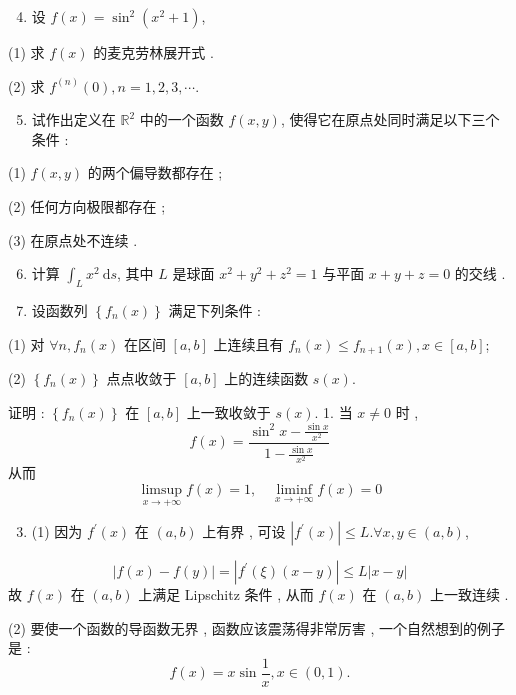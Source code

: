 \documentclass[10pt]{article}
\begin{document}
\begin{enumerate}
  \setcounter{enumi}{3}
  \item  设  $f(x)=\sin ^{2}\left(x^{2}+1\right)$,
\end{enumerate}
(1)  求  $f(x)$  的麦克劳林展开式 .

(2)  求  $f^{(n)}(0), n=1,2,3, \cdots$.

\begin{enumerate}
  \setcounter{enumi}{4}
  \item  试作出定义在  $\mathbb{R}^{2}$  中的一个函数  $f(x, y)$,  使得它在原点处同时满足以下三个条件 :
\end{enumerate}
(1) $f(x, y)$  的两个偏导数都存在 ;

(2)  任何方向极限都存在 ;

(3)  在原点处不连续 .

\begin{enumerate}
  \setcounter{enumi}{5}
  \item  计算  $\int_{L} x^{2} \mathrm{~d} s$,  其中  $L$  是球面  $x^{2}+y^{2}+z^{2}=1$  与平面  $x+y+z=0$  的交线 .

  \item  设函数列  $\left\{f_{n}(x)\right\}$  满足下列条件 :

\end{enumerate}
(1)  对  $\forall n, f_{n}(x)$  在区间  $[a, b]$  上连续且有  $f_{n}(x) \leqslant f_{n+1}(x), x \in[a, b]$;

(2) $\left\{f_{n}(x)\right\}$  点点收敛于  $[a, b]$  上的连续函数  $s(x)$.

 证明 : $\left\{f_{n}(x)\right\}$  在  $[a, b]$  上一致收敛于  $s(x)$. 1.  当  $x \neq 0$  时 ,
$$
f(x)=\frac{\sin ^{2} x-\frac{\sin x}{x^{2}}}{1-\frac{\sin x}{x^{2}}}
$$
 从而 
$$
\limsup _{x \rightarrow+\infty} f(x)=1, \quad \liminf _{x \rightarrow+\infty} f(x)=0
$$

\begin{enumerate}
  \setcounter{enumi}{2}
  \item (1)  因为  $f^{\prime}(x)$  在  $(a, b)$  上有界 ,  可设  $\left|f^{\prime}(x)\right| \leqslant L . \forall x, y \in(a, b)$,
\end{enumerate}
$$
|f(x)-f(y)|=\left|f^{\prime}(\xi)(x-y)\right| \leqslant L|x-y|
$$
 故  $f(x)$  在  $(a, b)$  上满足  Lipschitz  条件 ,  从而  $f(x)$  在  $(a, b)$  上一致连续 .

(2)  要使一个函数的导函数无界 ,  函数应该震荡得非常厉害 , 一个自然想到的例子是 :
$$
f(x)=x \sin \frac{1}{x}, x \in(0,1) .
$$
\end{document}

